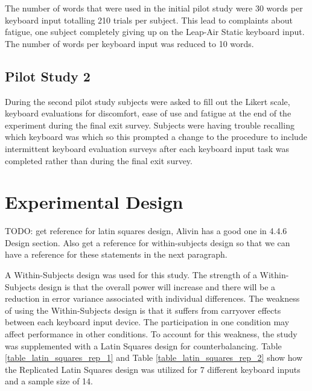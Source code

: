 The number of words that were used in the initial pilot study were 30 words per keyboard input totalling 210 trials per subject. This lead to complaints about fatigue, one subject completely giving up on the Leap-Air Static keyboard input. The number of words per keyboard input was reduced to 10 words.

\subsection{Pilot Study 2}

During the second pilot study subjects were asked to fill out the Likert scale, keyboard evaluations for discomfort, ease of use and fatigue at the end of the experiment during the final exit survey. Subjects were having trouble recalling which keyboard was which so this prompted a change to the procedure to include intermittent keyboard evaluation surveys after each keyboard input task was completed rather than during the final exit survey.

\section{Experimental Design} \label{3_experimental_design}

TODO: get reference for latin squares design, Alivin has a good one in 4.4.6 Design section. Also get a reference for within-subjects design so that we can have a reference for these statements in the next paragraph.

A Within-Subjects design was used for this study. The strength of a Within-Subjects design is that the overall power will increase and there will be a reduction in error variance associated with individual differences. The weakness of using the Within-Subjects design is that it suffers from carryover effects between each keyboard input device. The participation in one condition may affect performance in other conditions. To account for this weakness, the study was supplemented with a Latin Squares design for counterbalancing. Table \ref{table_latin_squares_rep_1} and Table \ref{table_latin_squares_rep_2} show how the Replicated Latin Squares design was utilized for 7 different keyboard inputs and a sample size of 14.

